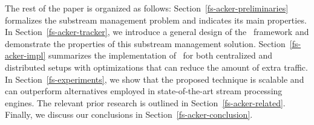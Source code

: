 The rest of the paper is organized as follows: Section~\ref{fs-acker-preliminaries} formalizes the substream management problem and indicates its main properties. In Section~\ref{fs-acker-tracker}, we introduce a general design of the \tracker\ framework and demonstrate the properties of this substream management solution. Section~\ref{fs-acker-impl} summarizes the implementation of \tracker\ for both centralized and distributed setups with optimizations that can reduce the amount of extra traffic. In Section~\ref{fs-experiments}, we show that the proposed technique is scalable and can outperform alternatives employed in state-of-the-art stream processing engines. The relevant prior research is outlined in Section~\ref{fs-acker-related}. Finally, we discuss our conclusions in Section~\ref{fs-acker-conclusion}.